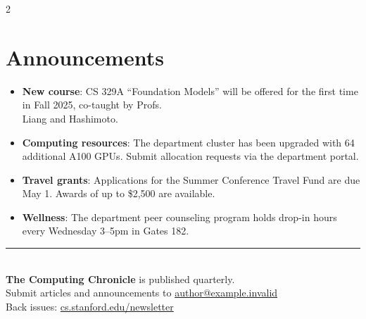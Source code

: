 \documentclass[10pt,a4paper]{article}
\begin{document}
\begin{multicols}{2}
\begin{center}
\end{center}

\section{Announcements}

\begin{itemize}[leftmargin=1.2em, itemsep=4pt]
  \item \textbf{New course}: CS 329A ``Foundation Models'' will be offered for the first time in Fall 2025, co-taught by Profs.\\ Liang and Hashimoto.
  \item \textbf{Computing resources}: The department cluster has been upgraded with 64 additional A100 GPUs. Submit allocation requests via the department portal.
  \item \textbf{Travel grants}: Applications for the Summer Conference Travel Fund are due May 1. Awards of up to \$2,500 are available.
  \item \textbf{Wellness}: The department peer counseling program holds drop-in hours every Wednesday 3--5pm in Gates 182.
\end{itemize}

\vspace{0.5cm}
\begin{center}
{\color{rulecolor}\rule{0.8\columnwidth}{0.5pt}}\\[6pt]
{\small\color{darktext}
\textbf{The Computing Chronicle} is published quarterly.\\
Submit articles and announcements to \href{mailto:author@example.invalid}{author@example.invalid}\\
Back issues: \href{https://cs.stanford.edu/newsletter}{cs.stanford.edu/newsletter}}
\end{center}

\end{multicols}
\end{document}

